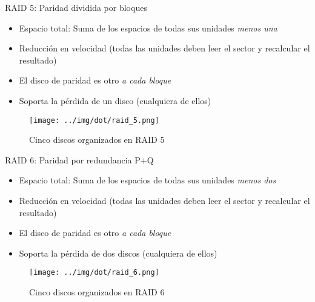\documentclass[presentation]{beamer}
\begin{document}
\begin{frame}[label={sec:org78d0ab9}]{RAID 5: Paridad dividida por bloques}
\begin{itemize}
\item Espacio total: Suma de los espacios de todas sus unidades \emph{menos
una}
\item Reducción en velocidad (todas las unidades deben leer el sector y
recalcular el resultado)
\item El disco de paridad es otro \emph{a cada bloque}
\item Soporta la pérdida de un disco (cualquiera de ellos)
\end{itemize}
\begin{figure}[htbp]
\centering
\texttt{[image: ../img/dot/raid\_5.png]}
\caption{Cinco discos organizados en RAID 5}
\end{figure}
\end{frame}

\begin{frame}[label={sec:org81e0813}]{RAID 6: Paridad por redundancia P+Q}
\begin{itemize}
\item Espacio total: Suma de los espacios de todas sus unidades \emph{menos
dos}
\item Reducción en velocidad (todas las unidades deben leer el sector y
recalcular el resultado)
\item El disco de paridad es otro \emph{a cada bloque}
\item Soporta la pérdida de dos discos (cualquiera de ellos)
\end{itemize}
\begin{figure}[htbp]
\centering
\texttt{[image: ../img/dot/raid\_6.png]}
\caption{Cinco discos organizados en RAID 6}
\end{figure}
\end{frame}
\end{document}
